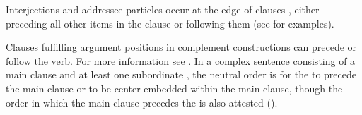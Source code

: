 Interjections and addressee particles occur at the edge of clauses , either preceding all other items in the clause or following them (see  for examples).

Clauses fulfilling argument positions in complement constructions can precede or follow the verb. For more information see . In a complex sentence consisting of a main clause and at least one subordinate , the neutral order is for the  to precede the main clause or to be center-embedded within the main clause, though the order in which the main clause precedes the  is also attested ().

